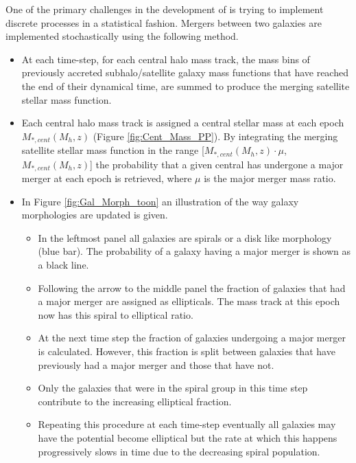 One of the primary challenges in the development of \steel is trying to implement discrete processes in a statistical fashion. Mergers between two galaxies are implemented stochastically using the following method.
\begin{itemize}
    \item At each time-step, for each central halo mass track, the mass bins of previously accreted subhalo/satellite galaxy mass functions that have reached the end of their dynamical time, are summed to produce the merging satellite stellar mass function. 
    \item Each central halo mass track is assigned a central stellar mass at each epoch $M_{*,cent}(M_{h}, z)$ (Figure \ref{fig:Cent_Mass_PP}). By integrating the merging satellite stellar mass function in the range [$M_{*,cent}(M_{h}, z) \cdot \mu$, $M_{*,cent}(M_{h}, z)$] the probability that a given central has undergone a major merger at each epoch is retrieved, where $\mu$ is the major merger mass ratio. 
    \item In Figure \ref{fig:Gal_Morph_toon} an illustration of the way galaxy morphologies are updated is given. 
    \begin{itemize}
        \item In the leftmost panel all galaxies are spirals or a disk like morphology (blue bar). The probability of a galaxy having a major merger is shown as a black line.
        \item Following the arrow to the middle panel the fraction of galaxies that had a major merger are assigned as ellipticals. The mass track at this epoch now has this spiral to elliptical ratio.
        \item At the next time step the fraction of galaxies undergoing a major merger is calculated. However, this fraction is split between galaxies that have previously had a major merger and those that have not. 
        \item Only the galaxies that were in the spiral group in this time step contribute to the increasing elliptical fraction.
        \item Repeating this procedure at each time-step eventually all galaxies may have the potential become elliptical but the rate at which this happens progressively slows in time due to the decreasing spiral population.
    \end{itemize}
\end{itemize}

